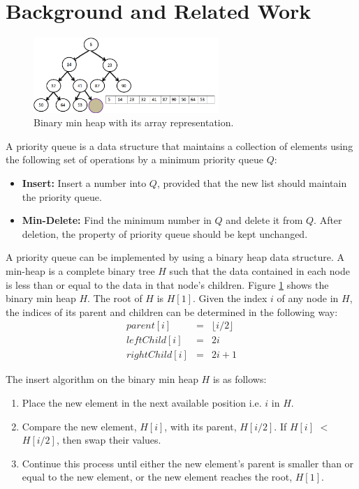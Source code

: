 \section{Background and Related Work}
\label{s:background}

\begin{figure}[!ht]
  \centering
  \includegraphics[width=7cm]{fig/fig2.png}
      \caption{Binary min heap with its array representation.}
    \label{fig2}
\end{figure}

A priority queue is a data structure that maintains a collection of elements using the following set of operations by a minimum priority queue $Q$:
\begin{itemize}
\item {\bf Insert:} Insert a number into $Q$, provided that the new list should maintain the priority queue.
\item {\bf Min-Delete:} Find the minimum number in $Q$ and delete it from $Q$. After deletion, the property of priority queue should be kept unchanged.
\end{itemize}

A priority queue can be implemented by using a binary heap data structure.
A min-heap is a complete binary tree $H$ such that the data contained in each node is less than or equal to the data in that node's children.
Figure \ref{fig2} shows the binary min heap $H$.
The root of $H$ is $H[1]$.
Given the index $i$ of any node in $H$, the indices of its parent and children can be determined in the following way:
\begin{eqnarray*}
parent[i] &=&  \lfloor i/2 \rfloor \\
leftChild[i] &=& 2i\\
rightChild[i] &=& 2i + 1
\end{eqnarray*}

The insert algorithm on the binary min heap $H$ is as follows:
\begin{enumerate}
\item Place the new element in the next available position i.e. $i$ in $H$.
\item Compare the new element, $H[i]$, with its parent, $H[i/2]$. If $H[i]$ $<$ $H[i/2]$, then swap their values.
\item Continue this process until either the new element's parent is smaller than or equal to the new element, or the new element reaches the root, $H[1]$.
\end{enumerate}

